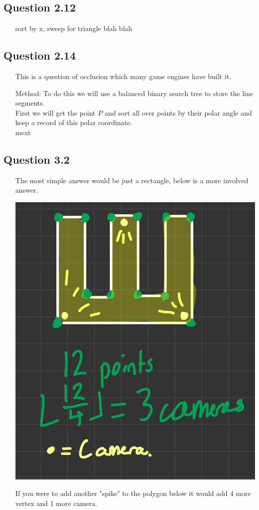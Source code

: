 \documentclass[12pt]{article}
\begin{document}
\subsection*{Question 2.12}
\begin{itemize}
    \item[] sort by x, sweep for triangle blah blah
\end{itemize}
\subsection*{Question 2.14}
\begin{itemize}
    \item[] This is a question of occlusion which many game engines have built it.
    \item[Method: ] To do this we will use a balanced binary search tree to store the line segments.
    \\ First we will get the point $P$ and sort all over points by their polar angle and keep a record of this polar coordinate.
    \\ mext
\end{itemize}
\subsection*{Question 3.2}
\begin{itemize}
    \item[] The most simple answer would be just a rectangle, below is a more involved answer.
    \item[] 
    \begin{center}
    \includegraphics[scale =0.2]{3.2.jpeg}
    \end{center}
    \item[] If you were to add another "spike" to the polygon below it would add 4 more vertex and 1 more camera.
\end{itemize}
\end{document}
